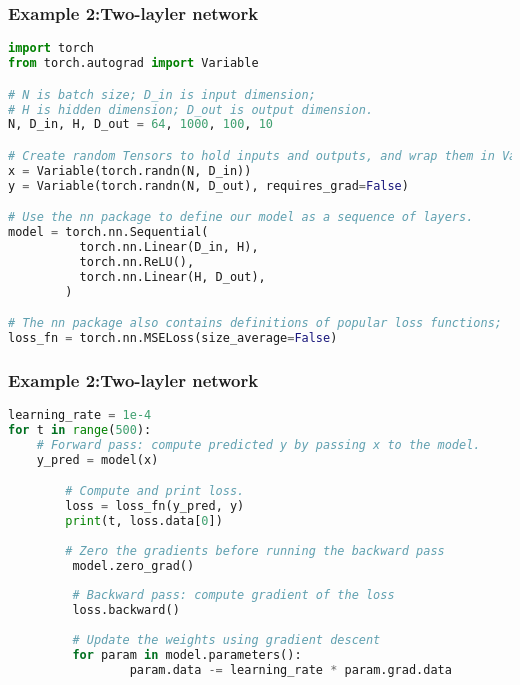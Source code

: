 \begin{frame}[fragile]
\MyLogo
\frametitle{Example 2:Two-layler network}  
\scriptsize{
\begin{lstlisting}[language=python]
import torch
from torch.autograd import Variable

# N is batch size; D_in is input dimension;
# H is hidden dimension; D_out is output dimension.
N, D_in, H, D_out = 64, 1000, 100, 10

# Create random Tensors to hold inputs and outputs, and wrap them in Variables.
x = Variable(torch.randn(N, D_in))
y = Variable(torch.randn(N, D_out), requires_grad=False)

# Use the nn package to define our model as a sequence of layers.
model = torch.nn.Sequential(
          torch.nn.Linear(D_in, H),
          torch.nn.ReLU(),
          torch.nn.Linear(H, D_out),
        )

# The nn package also contains definitions of popular loss functions;
loss_fn = torch.nn.MSELoss(size_average=False)
\end{lstlisting}
}
\end{frame}

\begin{frame}[fragile]
\MyLogo
\frametitle{Example 2:Two-layler network}  
\ContinueLineNumber
\scriptsize{
\begin{lstlisting}[language=python]
learning_rate = 1e-4
for t in range(500):
	# Forward pass: compute predicted y by passing x to the model.
	y_pred = model(x)

        # Compute and print loss.
        loss = loss_fn(y_pred, y)
        print(t, loss.data[0])
        
        # Zero the gradients before running the backward pass
         model.zero_grad()
         
         # Backward pass: compute gradient of the loss
         loss.backward()
         
         # Update the weights using gradient descent
         for param in model.parameters():
                 param.data -= learning_rate * param.grad.data
\end{lstlisting}
}
\end{frame}